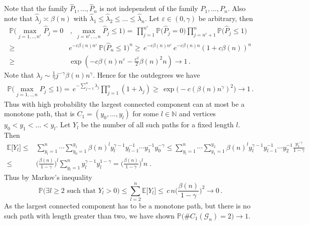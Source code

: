 \documentclass[12pt,a4paper]{article}
\numberwithin{equation}{section}
\begin{document}
Note that the family $\hat P_1,\dots,\hat P_n$ is not independent of the family $ P_1,\dots, P_n$. Also note that $\hat \lambda_j \asymp \beta(n)$ with $\hat \lambda_1 \le \hat \lambda_2 \le \ldots \le \hat \lambda_n$. Let $\varepsilon\in(0,\gamma)$ be arbitrary, then 
\begin{equation}
    \begin{aligned} \label{in}
    \mathbb P \Big(\max_{j=1,..,n^\varepsilon}\hat P_j= 0 & \,,\;\max_{j=n^\varepsilon,..,n}\hat P_j\le1 \Big)=\,\prod_{j=1}^{n^\varepsilon} \mathbb P \big(\hat P_j=0 \big)\prod_{j=n^\varepsilon+1}^n  \mathbb P \big(\hat P_j\le  1 \big) \\\ge\, &e^{-c\beta(n)n^\varepsilon}\, \mathbb P \big(\hat P_n\le  1 \big)^n  \ge  \,e^{-c\beta(n)n^\varepsilon}\, e^{-c\beta(n)n}(1+c\beta(n))^n
    \\ \ge\, & \exp (-c\beta(n)n^\varepsilon- \tfrac{ c^2}{2}\beta(n)^2 n) \to 1\,.
\end{aligned}
\end{equation}
Note that $\lambda_j \sim  \tfrac1\gamma j^{-\gamma}\beta(n) n^{\gamma}$. Hence for the outdegrees we have
\begin{equation}
    \begin{aligned}\label{out}
      \mathbb P \Big(\max_{j=1,..,n} P_j\le  1 \Big) =\,  e^{-\sum_{j=1}^n \lambda_j} \prod_{j=1}^n (1+\lambda_j)  \ge\, \exp\big( -c (\beta(n)n^\gamma)^2\big)\to 1\,.
\end{aligned}
\end{equation}
Thus with high probability the largest connected component can at most be a monotone path, that is $C_1=(y_0,\dots,y_l)$ for some $l\in\mathbb N$ and vertices $y_0<y_1<\ldots<y_l$. Let $Y_l$ be the number of all such paths for a fixed length $l$. Then
\begin{align*}
    \mathbb{E}\big[Y_l\big]\le & \sum_{y_l=1}^n \cdots  %
    \sum_{y_0=1}^{y_1} \beta(n)^l y_l^{\gamma-1} y_{l-1}^{-1}\cdots y_{1}^{-1} y_0^{-\gamma} 
     \le  \sum_{y_l=1}^n \cdots  \sum_{y_1=1}^{y_2} \beta(n)^l y_l^{\gamma-1} y_{l-1}^{-1}\cdots y_{2}^{-1} \tfrac{y_1^{-\gamma} }{1-\gamma}
    \\ \le & \Big(\frac{\beta(n)}{1-\gamma}\Big)^l\sum_{y_l=1}^n y_l^{\gamma-1}y_l^{1-\gamma} = \Big(\frac{\beta(n)}{1-\gamma}\Big)^ln\;.
\end{align*}
Thus by Markov's inequality
\begin{equation}\label{eyl}
    \mathbb P\big(\exists l\ge2 \text{ such that }Y_l>0\big)\le 
    \sum_{l=2}^n\mathbb{E}\big[Y_l\big]
    \le \,c\,n \Big(\frac{\beta(n)}{1-\gamma}\Big)^2\to 0\,.
\end{equation}
As the largest connected component has to be a monotone path, but there is no such path with length greater than two, we have shown 
$\mathbb P\big( \#C_1(\mathscr{G}_n)=2\big)\to 1$.\medskip
\end{document}

